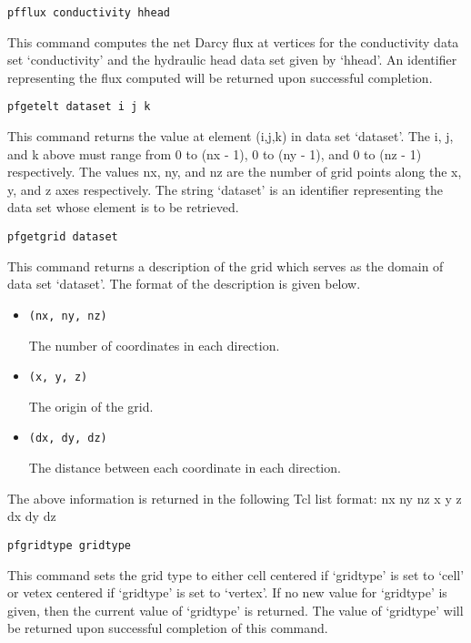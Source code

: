 \begin{description}
\item{\begin{verbatim}pfflux conductivity hhead\end{verbatim}}
This command computes the net Darcy flux at vertices for the
conductivity data set `conductivity' and the hydraulic head data      
set given by `hhead'.  An identifier representing the flux computed   
will be returned upon successful completion.
        
\item{\begin{verbatim}pfgetelt dataset i j k\end{verbatim}}
This command returns the value at element (i,j,k) in data set         
`dataset'.  The i, j, and k above must range from 0 to (nx - 1), 0 to 
(ny - 1), and 0 to (nz - 1) respectively.  The values nx, ny, and nz
are the number of grid points along the x, y, and z axes respectively.
The string `dataset' is an identifier representing the data set whose
element is to be retrieved.
        
\item{\begin{verbatim}pfgetgrid dataset\end{verbatim}}
This command returns a description of the grid which serves as the
domain of data set `dataset'.  The format of the description is given 
below.
\begin{itemize}
\item{\begin{verbatim}(nx, ny, nz)\end{verbatim}
The number of coordinates in each direction.}
\item{\begin{verbatim}(x, y, z)\end{verbatim}The origin of the grid.}
\item{\begin{verbatim}(dx, dy, dz)\end{verbatim}The distance between each
coordinate in each direction.}
\end{itemize}
The above information is returned in the following Tcl list format:
{nx ny nz} {x y z} {dx dy dz}
        
\item{\begin{verbatim}pfgridtype gridtype\end{verbatim}}
This command sets the grid type to either cell centered if `gridtype'
is set to `cell' or vetex centered if `gridtype' is set to `vertex'.
If no new value for `gridtype' is given, then the current value of
`gridtype' is returned.  The value of `gridtype' will be returned upon
successful completion of this command.


\end{description}
